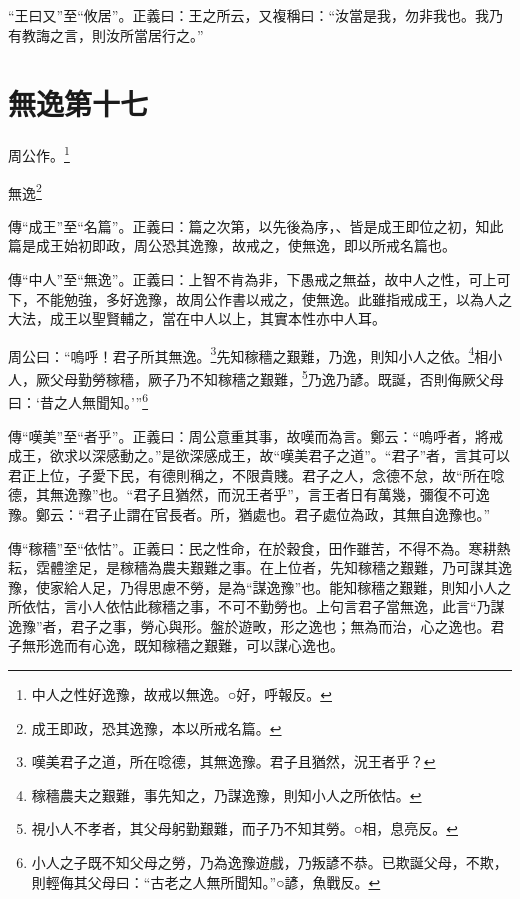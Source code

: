 {\noindent\shu{}\fzkt “王曰又”至“攸居”。正義曰：王之所云，又複稱曰：“汝當是我，勿非我也。我乃有教誨之言，則汝所當居行之。” \par}

\section{無逸第十七}


周公作。\footnote{中人之性好逸豫，故戒以無逸。○好，呼報反。}

無逸\footnote{成王即政，恐其逸豫，本以所戒名篇。}


{\noindent\zhuan{}\fzbyks 傳“成王”至“名篇”。正義曰：篇之次第，以先後為序，、皆是成王即位之初，知此篇是成王始初即政，周公恐其逸豫，故戒之，使無逸，即以所戒名篇也。 \par}

{\noindent\shu{}\fzkt 傳“中人”至“無逸”。正義曰：上智不肯為非，下愚戒之無益，故中人之性，可上可下，不能勉強，多好逸豫，故周公作書以戒之，使無逸。此雖指戒成王，以為人之大法，成王以聖賢輔之，當在中人以上，其實本性亦中人耳。 \par}

周公曰：“嗚呼！君子所其無逸。\footnote{嘆美君子之道，所在唸德，其無逸豫。君子且猶然，況王者乎？}先知稼穡之艱難，乃逸，則知小人之依。\footnote{稼穡農夫之艱難，事先知之，乃謀逸豫，則知小人之所依怙。}相小人，厥父母勤勞稼穡，厥子乃不知稼穡之艱難，\footnote{視小人不孝者，其父母躬勤艱難，而子乃不知其勞。○相，息亮反。}乃逸乃諺。既誕，否則侮厥父母曰：‘昔之人無聞知。’”\footnote{小人之子既不知父母之勞，乃為逸豫遊戲，乃叛諺不恭。已欺誕父母，不欺，則輕侮其父母曰：“古老之人無所聞知。”○諺，魚戰反。}


{\noindent\zhuan{}\fzbyks 傳“嘆美”至“者乎”。正義曰：周公意重其事，故嘆而為言。鄭云：“嗚呼者，將戒成王，欲求以深感動之。”是欲深感成王，故“嘆美君子之道”。“君子”者，言其可以君正上位，子愛下民，有德則稱之，不限貴賤。君子之人，念德不怠，故“所在唸德，其無逸豫”也。“君子且猶然，而況王者乎”，言王者日有萬幾，彌復不可逸豫。鄭云：“君子止謂在官長者。所，猶處也。君子處位為政，其無自逸豫也。” \par}

{\noindent\zhuan{}\fzbyks 傳“稼穡”至“依怙”。正義曰：民之性命，在於穀食，田作雖苦，不得不為。寒耕熱耘，霑體塗足，是稼穡為農夫艱難之事。在上位者，先知稼穡之艱難，乃可謀其逸豫，使家給人足，乃得思慮不勞，是為“謀逸豫”也。能知稼穡之艱難，則知小人之所依怙，言小人依怙此稼穡之事，不可不勤勞也。上句言君子當無逸，此言“乃謀逸豫”者，君子之事，勞心與形。盤於遊畋，形之逸也；無為而治，心之逸也。君子無形逸而有心逸，既知稼穡之艱難，可以謀心逸也。 \par}

